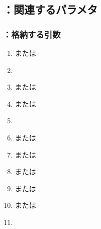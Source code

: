 \subsection{\KEndFaceOutCChamferRLeft：関連するパラメタ}

\subsubsection{\KEndFaceOutCChamferRLeft：格納する引数}
\begin{enumerate}[label*=\sarrow]
\item \PMTopOutcutExists または\PMBottomOutcutExists
\item \PMChamferType
\item \PMTopOutcutACWidth または\PMBottomOutcutACWidth
\item \PMTopOutcutBDWidth または\PMBottomOutcutBDWidth
\item \PMODCornerR
\item \PMTopOutcutCornerR または\PMBottomOutcutCornerR
\item \PMTopEndFaceOutCChamferLength または\PMBottomEndFaceOutCChamferLength
\item \PMTopEndFaceOutRChamferRadius または\PMBottomEndFaceOutRChamferRadius
\item \PMTopReAlocationLength または\PMBottomReAlocationLength
\item \PMTopAlocationLength または\PMBottomAlocationLength
\item \PMCenterCurvatureRadius
\end{enumerate}

\clearpage
